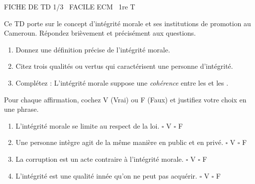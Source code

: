 \documentclass[11pt]{article}
\begin{document}
\begin{tcolorbox}[enhanced,colback=popink,colframe=popink,arc=10pt,boxrule=0pt,left=12pt,right=12pt,top=9pt,bottom=9pt]
{\color{white}\popxbold\small FICHE DE TD 1/3 \textbullet\ FACILE \hfill ECM \textbullet\ 1re T\par}
\end{tcolorbox}
\vspace{4pt}
\noindent Ce TD porte sur le concept d'intégrité morale et ses institutions de promotion au Cameroun. Répondez brièvement et précisément aux questions.

\begin{exercice}
\begin{enumerate}
    \item Donnez une définition précise de l'intégrité morale.
    \item Citez trois qualités ou vertus qui caractérisent une personne d'intégrité.
    \item Complétez : L'intégrité morale suppose une \textit{cohérence} entre les \underline{\hspace{4cm}} et les \underline{\hspace{4cm}}.
\end{enumerate}
\end{exercice}

\begin{exercice}
Pour chaque affirmation, cochez V (Vrai) ou F (Faux) et justifiez votre choix en une phrase.
\begin{enumerate}
    \item L'intégrité morale se limite au respect de la loi. \hfill $\square$ V \quad $\square$ F
    \item Une personne intègre agit de la même manière en public et en privé. \hfill $\square$ V \quad $\square$ F
    \item La corruption est un acte contraire à l'intégrité morale. \hfill $\square$ V \quad $\square$ F
    \item L'intégrité est une qualité innée qu'on ne peut pas acquérir. \hfill $\square$ V \quad $\square$ F
\end{enumerate}
\end{exercice}
\end{document}
